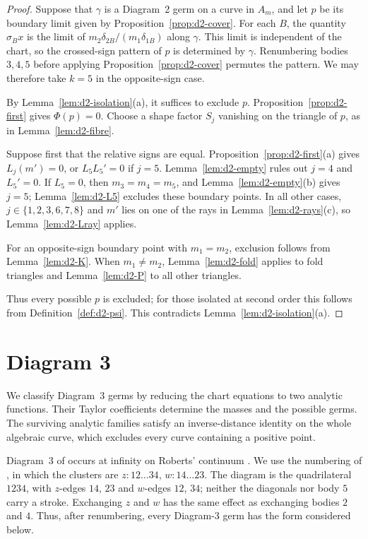 \documentclass[Threeside,11pt]{article}
\theoremstyle{definition}
\theoremstyle{remark}
\numberwithin{equation}{section}
\theoremstyle{remark}
\begin{document}
\begin{proof}
{Suppose that $\gamma$ is a Diagram~2 germ on a curve in $A_m$, and
let $p$ be its boundary limit given by Proposition~\ref{prop:d2-cover}.
For each $B$, the quantity $\sigma_Bx$ is the limit of
$m_2\delta_{2B}/(m_1\delta_{1B})$ along $\gamma$.
This limit is independent of the chart, so the crossed-sign pattern of $p$ is
determined by $\gamma$.
Renumbering bodies $3,4,5$ before applying Proposition~\ref{prop:d2-cover} permutes the
pattern. We may therefore take $k=5$ in the opposite-sign case.

By Lemma~\ref{lem:d2-isolation}(a), it suffices to exclude $p$.
Proposition~\ref{prop:d2-first} gives $\Phi(p)=0$.
Choose a shape factor $S_j$ vanishing on the triangle of $p$, as in
Lemma~\ref{lem:d2-fibre}.}

{Suppose first that the relative signs are equal.
Proposition~\ref{prop:d2-first}(a) gives $L_j(m')=0$, or $L_5L_5'=0$ if $j=5$.
Lemma~\ref{lem:d2-empty} rules out $j=4$ and $L_5'=0$.
If $L_5=0$, then $m_3=m_4=m_5$, and Lemma~\ref{lem:d2-empty}(b) gives $j=5$;
Lemma~\ref{lem:d2-L5} excludes these boundary points.
In all other cases, $j\in\{1,2,3,6,7,8\}$ and $m'$ lies on one of the rays in
Lemma~\ref{lem:d2-rays}(c), so Lemma~\ref{lem:d2-Lray} applies.}

{For an opposite-sign boundary point with $m_1=m_2$, exclusion follows from
Lemma~\ref{lem:d2-K}.
When $m_1\ne m_2$, Lemma~\ref{lem:d2-fold} applies to fold triangles and
Lemma~\ref{lem:d2-P} to all other triangles.}

{Thus every possible $p$ is excluded; for those isolated at second
order this follows from Definition~\ref{def:d2-psi}.
This contradicts Lemma~\ref{lem:d2-isolation}(a).}
\end{proof}





\section{Diagram 3}\label{sec:d3}

We classify Diagram~3 germs by reducing the chart equations to two analytic
functions. Their Taylor coefficients determine the masses and the possible germs.
The surviving analytic families satisfy an inverse-distance identity on the whole
algebraic curve, which excludes every curve containing a positive point.

{Diagram~3 of \cite[Fig.~11]{AK} occurs at infinity on Roberts' continuum
\cite[\S7.2]{AK}. We use the numbering of \cite[\S5.2 and \S8.3]{AK}, in which the clusters are
$z:12\ldots34$, $w:14\ldots23$. The diagram is the quadrilateral $1234$, with $z$-edges $14$, $23$ and
$w$-edges $12$, $34$; neither the diagonals nor body $5$ carry a stroke. Exchanging $z$ and $w$
has the same effect as exchanging bodies $2$ and $4$. Thus, after renumbering, every Diagram-3 germ
has the form considered below.}
\end{document}
